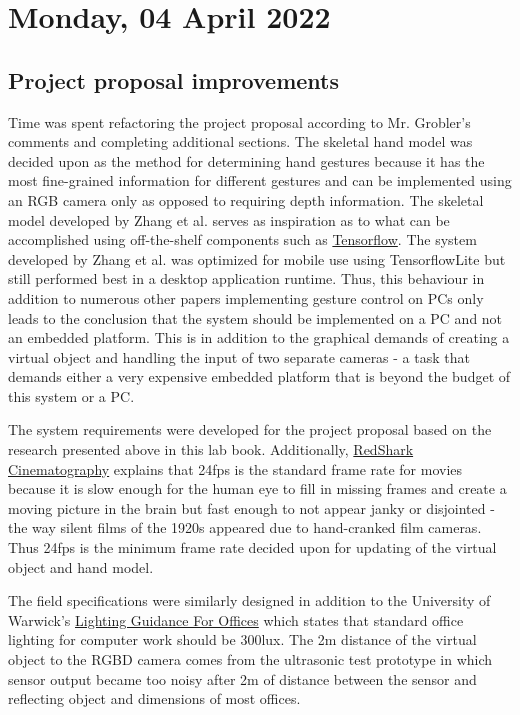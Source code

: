 \section[2022/04/04]{Monday, 04 April 2022}

\subsection{Project proposal improvements}

Time was spent refactoring the project proposal according to Mr. Grobler's comments and completing additional sections. The skeletal hand model was decided upon as the method for determining hand gestures because it has the most fine-grained information for different gestures and can be implemented using an RGB camera only as opposed to requiring depth information. The skeletal model developed by Zhang et al. \cite{mediapipe_hands} serves as inspiration as to what can be accomplished using off-the-shelf components such as \href{https://www.tensorflow.org}{Tensorflow}. The system developed by Zhang et al. was optimized for mobile use using TensorflowLite but still performed best in a desktop application runtime. Thus, this behaviour in addition to numerous other papers implementing gesture control on PCs only leads to the conclusion that the system should be implemented on a PC and not an embedded platform. This is in addition to the graphical demands of creating a virtual object and handling the input of two separate cameras - a task that demands either a very expensive embedded platform that is beyond the budget of this system or a PC. \newline

The system requirements were developed for the project proposal based on the research presented above in this lab book. Additionally, \href{https://www.redsharknews.com/technology-computing/item/3881-why-24-frames-per-second-is-still-the-gold-standard-for-film}{RedShark Cinematography} explains that 24fps is the standard frame rate for movies because it is slow enough for the human eye to fill in missing frames and create a moving picture in the brain but fast enough to not appear janky or disjointed - the way silent films of the 1920s appeared due to hand-cranked film cameras. Thus 24fps is the minimum frame rate decided upon for updating of the virtual object and hand model. \newline

The field specifications were similarly designed in addition to the University of Warwick's \href{https://warwick.ac.uk/services/healthsafetywellbeing/guidance/officelighting/}{Lighting Guidance For Offices} which states that standard office lighting for computer work should be 300lux. The 2m distance of the virtual object to the RGBD camera comes from the ultrasonic test prototype in which sensor output became too noisy after 2m of distance between the sensor and reflecting object and dimensions of most offices. \newline

